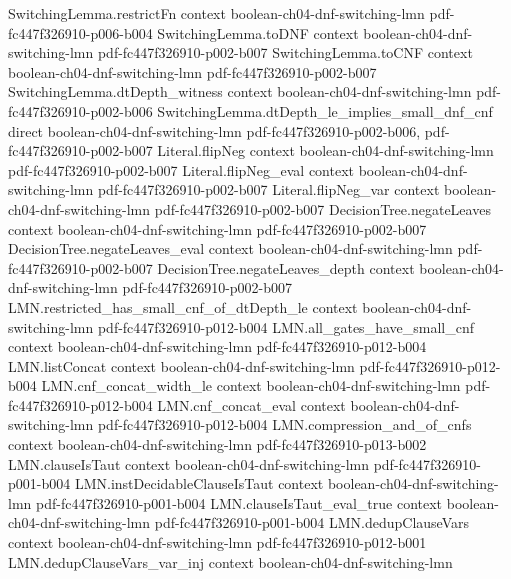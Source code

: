 \begin{lemma}
\proofstep
  {SwitchingLemma.restrictFn}
  {context}
  {boolean-ch04-dnf-switching-lmn}
  {pdf-fc447f326910-p006-b004}
\proofstep
  {SwitchingLemma.toDNF}
  {context}
  {boolean-ch04-dnf-switching-lmn}
  {pdf-fc447f326910-p002-b007}
\proofstep
  {SwitchingLemma.toCNF}
  {context}
  {boolean-ch04-dnf-switching-lmn}
  {pdf-fc447f326910-p002-b007}
\proofstep
  {SwitchingLemma.dtDepth_witness}
  {context}
  {boolean-ch04-dnf-switching-lmn}
  {pdf-fc447f326910-p002-b006}
\proofstep
  {SwitchingLemma.dtDepth_le_implies_small_dnf_cnf}
  {direct}
  {boolean-ch04-dnf-switching-lmn}
  {pdf-fc447f326910-p002-b006,
    pdf-fc447f326910-p002-b007}
\proofstep
  {Literal.flipNeg}
  {context}
  {boolean-ch04-dnf-switching-lmn}
  {pdf-fc447f326910-p002-b007}
\proofstep
  {Literal.flipNeg_eval}
  {context}
  {boolean-ch04-dnf-switching-lmn}
  {pdf-fc447f326910-p002-b007}
\proofstep
  {Literal.flipNeg_var}
  {context}
  {boolean-ch04-dnf-switching-lmn}
  {pdf-fc447f326910-p002-b007}
\proofstep
  {DecisionTree.negateLeaves}
  {context}
  {boolean-ch04-dnf-switching-lmn}
  {pdf-fc447f326910-p002-b007}
\proofstep
  {DecisionTree.negateLeaves_eval}
  {context}
  {boolean-ch04-dnf-switching-lmn}
  {pdf-fc447f326910-p002-b007}
\proofstep
  {DecisionTree.negateLeaves_depth}
  {context}
  {boolean-ch04-dnf-switching-lmn}
  {pdf-fc447f326910-p002-b007}
\proofstep
  {LMN.restricted_has_small_cnf_of_dtDepth_le}
  {context}
  {boolean-ch04-dnf-switching-lmn}
  {pdf-fc447f326910-p012-b004}
\proofstep
  {LMN.all_gates_have_small_cnf}
  {context}
  {boolean-ch04-dnf-switching-lmn}
  {pdf-fc447f326910-p012-b004}
\proofstep
  {LMN.listConcat}
  {context}
  {boolean-ch04-dnf-switching-lmn}
  {pdf-fc447f326910-p012-b004}
\proofstep
  {LMN.cnf_concat_width_le}
  {context}
  {boolean-ch04-dnf-switching-lmn}
  {pdf-fc447f326910-p012-b004}
\proofstep
  {LMN.cnf_concat_eval}
  {context}
  {boolean-ch04-dnf-switching-lmn}
  {pdf-fc447f326910-p012-b004}
\proofstep
  {LMN.compression_and_of_cnfs}
  {context}
  {boolean-ch04-dnf-switching-lmn}
  {pdf-fc447f326910-p013-b002}
\proofstep
  {LMN.clauseIsTaut}
  {context}
  {boolean-ch04-dnf-switching-lmn}
  {pdf-fc447f326910-p001-b004}
\proofstep
  {LMN.instDecidableClauseIsTaut}
  {context}
  {boolean-ch04-dnf-switching-lmn}
  {pdf-fc447f326910-p001-b004}
\proofstep
  {LMN.clauseIsTaut_eval_true}
  {context}
  {boolean-ch04-dnf-switching-lmn}
  {pdf-fc447f326910-p001-b004}
\proofstep
  {LMN.dedupClauseVars}
  {context}
  {boolean-ch04-dnf-switching-lmn}
  {pdf-fc447f326910-p012-b001}
\proofstep
  {LMN.dedupClauseVars_var_inj}
  {context}
  {boolean-ch04-dnf-switching-lmn}

\end{lemma}
